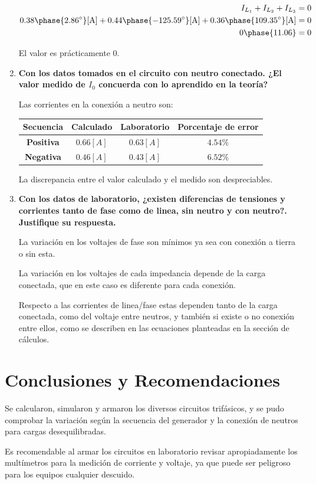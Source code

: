 \documentclass[letter,11pt]{article}
\begin{document}
\begin{enumerate}
\begin{equation*}
    \begin{split}
        I_{L_1}+I_{L_2}+I_{L_3}=0\\
        0.38\phase{2.86^{\circ}}[\text{A}]+
        0.44\phase{-125.59^{\circ}}[\text{A}]+
        0.36\phase{109.35^{\circ}}[\text{A}]=0\\
        0\phase{11.06}=0\\
    \end{split}
\end{equation*}

El valor es prácticamente $0$.

\item \textbf{Con los datos tomados en el circuito con neutro conectado. ¿El
valor medido de $I_0$ concuerda con lo aprendido en la teoría?}

Las corrientes en la conexión a neutro son:
\begin{center}
    \begin{tabular}{|c||c|c|c|}
    \hline
    \textbf{Secuencia} & \textbf{Calculado} & \textbf{Laboratorio} &
    \textbf{Porcentaje de error}
    \tabularnewline \hline \hline
    \textbf{Positiva} & $0.66[A]$ & $0.63[A]$ & $4.54\%$
    \tabularnewline \hline
    \textbf{Negativa} & $0.46[A]$ & $0.43[A]$ & $6.52\%$
    \tabularnewline \hline
    \end{tabular}
\end{center}

La discrepancia entre el valor calculado y el medido son despreciables.

\item \textbf{Con los datos de laboratorio, ¿existen diferencias de tensiones y
corrientes tanto de fase como de linea, sin neutro y con neutro?. Justifique su
respuesta.}

La variación en los voltajes de fase son mínimos ya sea con conexión a tierra o
sin esta.

La variación en los voltajes de cada impedancia depende de la carga conectada,
que en este caso es diferente para cada conexión.

Respecto a las corrientes de linea/fase estas dependen tanto de la carga
conectada, como del voltaje entre neutros, y también si existe o no conexión
entre ellos, como se describen en las ecuaciones planteadas en la sección de
cálculos.

\end{enumerate}

\section{Conclusiones y Recomendaciones}

Se calcularon, simularon y armaron los diversos circuitos trifásicos, y se pudo
comprobar la variación según la secuencia del generador y la conexión de
neutros para cargas desequilibradas.

Es recomendable al armar los circuitos en laboratorio revisar apropiadamente los
multímetros para la medición de corriente y voltaje, ya que puede ser peligroso
para los equipos cualquier descuido.
\end{document}
